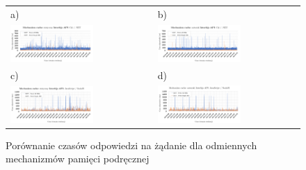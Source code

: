 \begin{figure}[htb]
  \advance\leftskip-1.7cm
    \begin{tabular}{@{}ll@{}}
    a) & b) \\
    \includegraphics[width=0.6\textwidth]{rys05/dotnet-static-cache-chart.pdf} & \includegraphics[width=0.6\textwidth]{rys05/dotnet-freq-cache-chart.pdf} \\
    c) & d) \\
    \includegraphics[width=0.6\textwidth]{rys05/nodejs-static-cache.pdf} & \includegraphics[width=0.6\textwidth]{rys05/nodejs-freq-cache.pdf}
    \end{tabular}
  \caption{Porównanie czasów odpowiedzi na żądanie dla odmiennych mechanizmów pamięci podręcznej}
  \label{fig:cache-charts}
\end{figure}

